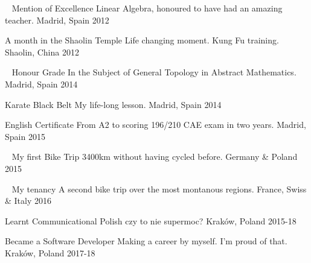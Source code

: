 
\begin{cvhonors}

  \cvhonor
    {\faUniversity \,\,\, Mention of Excellence} %
    {Linear Algebra, honoured to have had an amazing teacher.} %
    {Madrid, Spain} %
    {2012} %

  \cvhonor
    {\faTrophy \quad A month in the Shaolin Temple} %
    {Life changing moment. Kung Fu training.} %
    {Shaolin, China} %
    {2012} %

  \cvhonor
    {\faUniversity \,\,\, Honour Grade} %
    {In the Subject of General Topology in Abstract Mathematics.} %
    {Madrid, Spain} %
    {2014} %

  \cvhonor
    {\faTrophy \quad Karate Black Belt} %
    {My life-long lesson.} %
    {Madrid, Spain} %
    {2014} %

  \cvhonor
    {\faCertificate \quad English Certificate} %
    {From A2 to scoring 196/210 CAE exam in two years.} %
    {Madrid, Spain} %
    {2015} %

  \cvhonor
    {\faBicycle \,\,\, My first Bike Trip} %
    {3400km without having cycled before.} %
    {Germany \& Poland} %
    {2015} %

  \cvhonor
    {\faBicycle \,\,\, My tenancy} %
    {A second bike trip over the most montanous regions.} %
    {France, Swiss \& Italy} %
    {2016} %

\cvhonor
	{\faLanguage \quad Learnt Communicational Polish} %
	{czy to nie supermoc?} %
	{Kraków, Poland} %
	{2015-18} %

  \cvhonor
    {\faLanguage \quad Became a Software Developer} %
    {Making a career by myself. I'm proud of that.} %
    {Kraków, Poland} %
    {2017-18} %

\end{cvhonors}